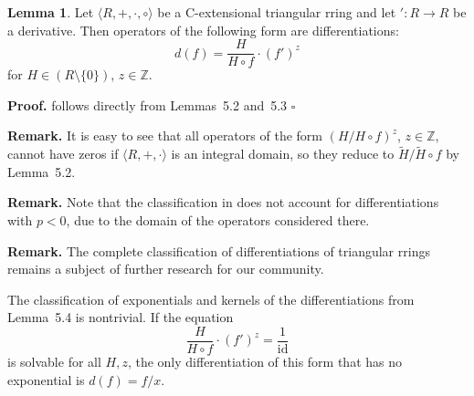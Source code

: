 \documentclass[12pt]{article}
\theoremstyle{definition}
\newtheorem{lemma}[definition]{Lemma}
\begin{document}
\vspace{10pt}
\begin{lemma}
Let \(\langle R, +, \cdot, \circ \rangle\) be a C-extensional triangular rring and let \({}': R \to R\) be a derivative.
Then operators of the following form are differentiations:
\[
d(f) = \frac{H}{H \circ f} \cdot (f')^z
\]
for \(H \in (R \setminus \{0\})\), \(z \in \mathbb{Z}\).

\vspace{10pt}
\textbf{Proof.} 
follows directly from Lemmas~5.2 and~5.3 $\square$
\end{lemma}

\vspace{10pt}
\noindent\textbf{Remark.}
It is easy to see that all operators of the form \((H / H \circ f)^z\), \(z \in \mathbb{Z}\), 
cannot have zeros if \(\langle R, +, \cdot \rangle\) is an integral domain, 
so they reduce to \(\widetilde{H} / \widetilde{H} \circ f\) by Lemma~5.2.

\vspace{10pt}
\noindent\textbf{Remark.}
Note that the classification in \cite{Artstein-Avidan2010} does not account for 
differentiations with \(p < 0\), due to the domain of the operators considered there.

\vspace{10pt}
\noindent\textbf{Remark.}
The complete classification of differentiations of triangular rrings remains a subject of further research for our community.

\vspace{10pt}
The classification of exponentials and kernels of the differentiations from Lemma~5.4 is nontrivial. 
If the equation
\[
\frac{H}{H \circ f} \cdot (f')^z = \frac{1}{\mathrm{id}}
\]
is solvable for all \(H, z\), the only differentiation of this form that has no exponential is \(d(f) = f/x\).
\end{document}
